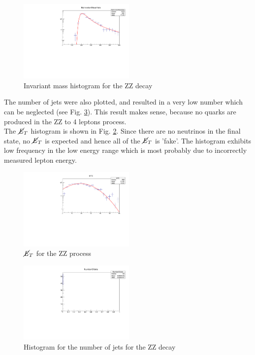 \documentclass[runningheads,a4paper]{llncs}
\begin{document}
\begin{figure}[H]
\centering
\includegraphics[height=4cm]{MyInvariantMassHistoWtihFit_ZZ}
\caption{Invariant mass histogram for the ZZ decay}
\label{fig:invmzz}
\end{figure}

The number of jets were also plotted, and resulted in a very low number which can be neglected (see Fig. \ref{fig:nojzz}). This result makes sense, because no quarks are produced in the ZZ to 4 leptons process.\\

The $\cancel{\it{E}}_{T}$ histogram is shown in Fig. \ref{fig:mtezz}. Since there are no neutrinos in the final state, no $\cancel{\it{E}}_{T}$ is expected and hence all of the $\cancel{\it{E}}_{T}$ is 'fake'. The histogram exhibits low frequency in the low energy range which is most probably due to incorrectly measured lepton energy.\\

\begin{figure}[H]
\centering
\includegraphics[height=4cm]{MTEWithFit_ZZ}
\caption{$\cancel{\it{E}}_{T}$ for the ZZ process}
\label{fig:mtezz}
\end{figure}

\begin{figure}
\centering
\includegraphics[height=4cm]{NumberOfJets_ZZ}
\caption{Histogram for the number of jets for the ZZ decay}
\label{fig:nojzz}
\end{figure}
\end{document}
